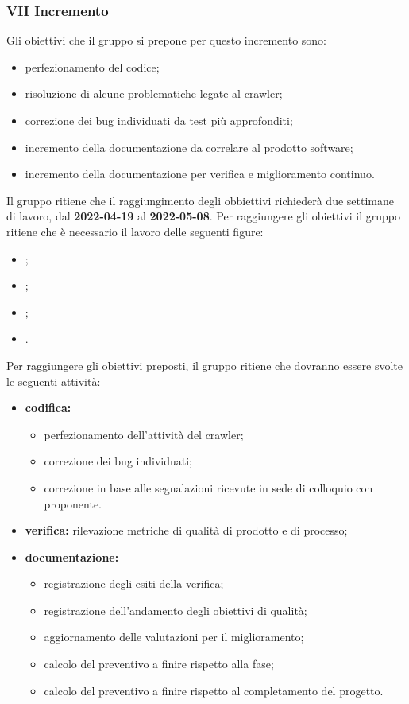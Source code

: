 \subsubsection{VII Incremento}
Gli obiettivi che il gruppo si prepone per questo incremento sono:
\begin{itemize}
 	\item perfezionamento del codice;
  	\item risoluzione di alcune problematiche legate al crawler;
  	\item correzione dei bug individuati da test più approfonditi;
 	\item incremento della documentazione da correlare al prodotto software;
	\item incremento della documentazione per verifica e miglioramento continuo.
\end{itemize}
Il gruppo ritiene che il raggiungimento degli obbiettivi richiederà due settimane di lavoro, dal \textbf{2022-04-19} al \textbf{2022-05-08}.
Per raggiungere gli obiettivi il gruppo ritiene che è necessario il lavoro delle seguenti figure:
\begin{itemize}
	\item \RE{};
 	\item \AM{};
    \item \PR{};
   	\item \VE{}.
\end{itemize}
Per raggiungere gli obiettivi preposti, il gruppo ritiene che dovranno essere svolte le seguenti attività:
\begin{itemize}
	\item \textbf{codifica:} 
			\begin{itemize}
				\item perfezionamento dell'attività del crawler;
				\item correzione dei bug individuati;
    			\item correzione in base alle segnalazioni ricevute in sede di colloquio con proponente.
			\end{itemize}
 	\item \textbf{verifica:} rilevazione metriche di qualità di prodotto e di processo;
	\item \textbf{documentazione:} 
	 \begin{itemize}
  		\item registrazione degli esiti della verifica;
     	\item registrazione dell’andamento degli obiettivi di qualità;
		\item aggiornamento delle valutazioni per il miglioramento; 
		\item calcolo del preventivo a finire rispetto alla fase;
		\item calcolo del preventivo a finire rispetto al completamento del progetto.
	 \end{itemize}
\end{itemize}

